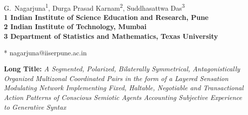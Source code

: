 \documentclass[10pt,fulladjust,letterpaper]{article}
\begin{document}
\vspace*{0.35in}

\begin{flushleft}
{\Large
\textbf{}
}
\newline
\\
G.~Nagarjuna\textsuperscript{1},
Durga Prasad Karnam\textsuperscript{2},
Suddhasattwa Das\textsuperscript{3}
\\
\bigskip
\bf{1} Indian Institute of Science Education and Research, Pune
\\
\bf{2} Indian Institute of Technology, Mumbai
\\
\bf{3} Department of Statistics and Mathematics, Texas University 

\bigskip
* nagarjuna@iiserpune.ac.in

\end{flushleft}
\noindent \textbf{Long Title:} \textit{A Segmented, Polarized,
  Bilaterally Symmetrical, Antagonistically Organized Multizonal
  Coordinated Pairs in the form of a Layered Sensation Modulating
  Network Implementing Fixed, Haltable, Negotiable and Transactional Action
  Patterns of Conscious Semiotic Agents Accounting Subjective
  Experience to Generative Syntax}













\end{document}
